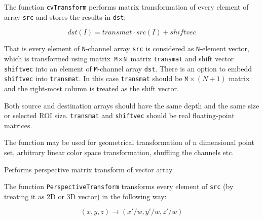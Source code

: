 \begin{description}
\end{description}

The function \texttt{cvTransform} performs matrix transformation of every element of array \texttt{src} and stores the results in \texttt{dst}:

\[
dst(I) = transmat \cdot src(I) + shiftvec %
\]

That is every element of \texttt{N}-channel array \texttt{src} is
considered as \texttt{N}-element vector, which is transformed using
matrix $\texttt{M} \times \texttt{N}$ matrix \texttt{transmat} and shift
vector \texttt{shiftvec} into an element of \texttt{M}-channel array
\texttt{dst}. There is an option to embedd \texttt{shiftvec} into
\texttt{transmat}. In this case \texttt{transmat} should be $\texttt{M}
\times (N+1)$ matrix and the right-most column is treated as the shift
vector.

Both source and destination arrays should have the same depth and the
same size or selected ROI size. \texttt{transmat} and \texttt{shiftvec}
should be real floating-point matrices.

The function may be used for geometrical transformation of n dimensional
point set, arbitrary linear color space transformation, shuffling the
channels etc.

\label{PerspectiveTransform}

Performs perspective matrix transform of vector array


\begin{description}
\end{description}


The function \texttt{PerspectiveTransform} transforms every element of \texttt{src} (by treating it as 2D or 3D vector) in the following way:

\[ (x, y, z) \rightarrow (x'/w, y'/w, z'/w) \]

